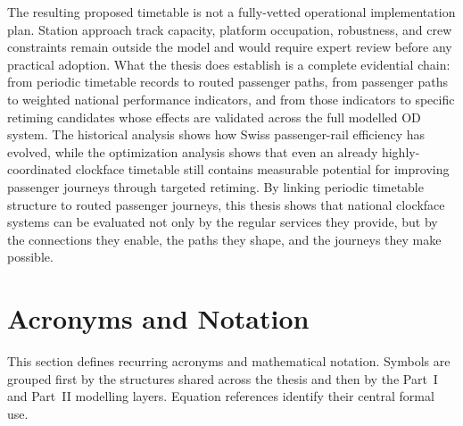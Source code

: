 \documentclass[preprint,12pt]{elsarticle}
\providecommand{\theHpage}{\thepage}
\begin{document}
The resulting proposed timetable is not a fully-vetted operational implementation plan. Station approach track capacity, platform occupation, robustness, and crew constraints remain outside the model and would require expert review before any practical adoption. What the thesis does establish is a complete evidential chain: from periodic timetable records to routed passenger paths, from passenger paths to weighted national performance indicators, and from those indicators to specific retiming candidates whose effects are validated across the full modelled OD system. The historical analysis shows how Swiss passenger-rail efficiency has evolved, while the optimization analysis shows that even an already highly-coordinated clockface timetable still contains measurable potential for improving passenger journeys through targeted retiming. By linking periodic timetable structure to routed passenger journeys, this thesis shows that national clockface systems can be evaluated not only by the regular services they provide, but by the connections they enable, the paths they shape, and the journeys they make possible.


\clearpage
\setcounter{page}{1}
\renewcommand{\thepage}{A\arabic{page}}
\renewcommand{\theHpage}{A\arabic{page}}
\section*{Acronyms and Notation}
\label{sec:acronyms-notation}

This section defines recurring acronyms and mathematical notation. Symbols are grouped first by the structures shared across the thesis and then by the Part~I and Part~II modelling layers. Equation references identify their central formal use.
\end{document}
